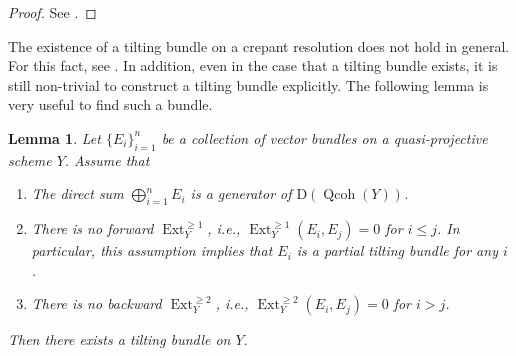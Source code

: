 \documentclass[pdftex]{sigma}
\DeclareMathOperator{\Ext}{Ext}
\DeclareMathOperator{\Qcoh}{Qcoh}
\numberwithin{equation}{section}
\newtheorem{Lemma}[Theorem]{Lemma}
\begin{document}
\begin{proof}See \cite[Lemma 3.4]{H17c}.
\end{proof}

The existence of a tilting bundle on a crepant resolution does not hold in general.
For this fact, see \cite[Theorem 4.20]{IW14b}.
In addition, even in the case that a tilting bundle exists, it is still non-trivial to construct a tilting bundle explicitly.
The following lemma is very useful to find such a bundle.

\begin{Lemma} \label{lem prelim tilting semiuniv}
Let $\{ E_i \}_{i=1}^n$ be a collection of vector bundles on a quasi-projective scheme $Y$.
Assume that
\begin{enumerate}\itemsep=0pt
\item[$(i)$] The direct sum $\bigoplus_{i=1}^n E_i$ is a generator of $\mathrm{D}(\Qcoh(Y))$.
\item[$(ii)$] There is no forward $\Ext^{\geq 1}_Y$, i.e., $\Ext_Y^{\geq 1}(E_i, E_j) = 0$ for $i \leq j$.
In particular, this assumption implies that $E_i$ is a partial tilting bundle for any $i$.
\item[$(iii)$] There is no backward $\Ext^{\geq 2}_Y$, i.e., $\Ext_Y^{\geq 2}(E_i, E_j) = 0$ for $i > j$.
\end{enumerate}
Then there exists a tilting bundle on $Y$.
\end{Lemma}
\end{document}
